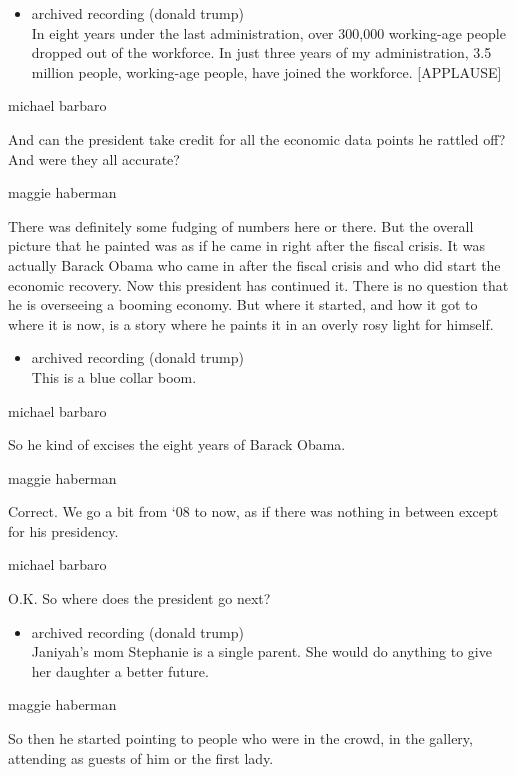 \begin{itemize}
\tightlist
\item
  archived recording (donald trump)\\
  In eight years under the last administration, over 300,000 working-age
  people dropped out of the workforce. In just three years of my
  administration, 3.5 million people, working-age people, have joined
  the workforce. {[}APPLAUSE{]}
\end{itemize}

michael barbaro

And can the president take credit for all the economic data points he
rattled off? And were they all accurate?

maggie haberman

There was definitely some fudging of numbers here or there. But the
overall picture that he painted was as if he came in right after the
fiscal crisis. It was actually Barack Obama who came in after the fiscal
crisis and who did start the economic recovery. Now this president has
continued it. There is no question that he is overseeing a booming
economy. But where it started, and how it got to where it is now, is a
story where he paints it in an overly rosy light for himself.

\begin{itemize}
\tightlist
\item
  archived recording (donald trump)\\
  This is a blue collar boom.
\end{itemize}

michael barbaro

So he kind of excises the eight years of Barack Obama.

maggie haberman

Correct. We go a bit from `08 to now, as if there was nothing in between
except for his presidency.

michael barbaro

O.K. So where does the president go next?

\begin{itemize}
\tightlist
\item
  archived recording (donald trump)\\
  Janiyah's mom Stephanie is a single parent. She would do anything to
  give her daughter a better future.
\end{itemize}

maggie haberman

So then he started pointing to people who were in the crowd, in the
gallery, attending as guests of him or the first lady.

